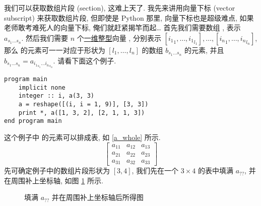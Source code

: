 我们可以获取数组片段 (section), 这难上天了. 我先来讲用向量下标 (vector subscript) 来获取数组片段, 但即使是 Python 那里, 向量下标也是超级难点, 如果老师敢考难死人的向量下标, 俺们就赶紧揭竿而起\dots{} 首先我们需要数组 , 表示 $a_{s_1\dots s_n}$. 然后我们需要 $n$ 个\uline{一维整型}向量 , 分别表示 $[{i_1}_1, \dots, {i_1}_{l_1}], \dots, [{i_n}_1, \dots, {i_n}_{l_n}]$, 那么  的元素可一一对应于形状为 $[l_1, \dots, l_n]$ 的数组 $b_{s_1\dots s_n}$ 的元素, 并且 $b_{ s_1\dots s_n }=a_{ {i_1}_{s_1}\dots {i_n}_{s_n} }$. 请看下面这个例子.
\begin{lstlisting}
program main
    implicit none
    integer :: i, a(3, 3)
    a = reshape([(i, i = 1, 9)], [3, 3])
    print *, a([1, 3, 2], [2, 1, 1, 3])
end program main
\end{lstlisting}
这个例子中  的元素可以排成表, 如 \eqref{a_whole} 所示.
\begin{equation}
    \begin{bmatrix}
        a_{11}&a_{12}&a_{13}\\
        a_{21}&a_{22}&a_{23}\\
        a_{31}&a_{32}&a_{33}
    \end{bmatrix}\label{a_whole}
\end{equation}
先可确定例子中的数组片段形状为 $[3, 4]$, 我们先在一个 $3\times4$ 的表中填满 $a_{??}$, 并在周围补上坐标轴, 如图 \ref{a_section_step_1} 所示.
\begin{figure}[htbp]
    \centering
    \caption{填满 $a_{??}$ 并在周围补上坐标轴后所得图}
    \label{a_section_step_1}
\end{figure}
